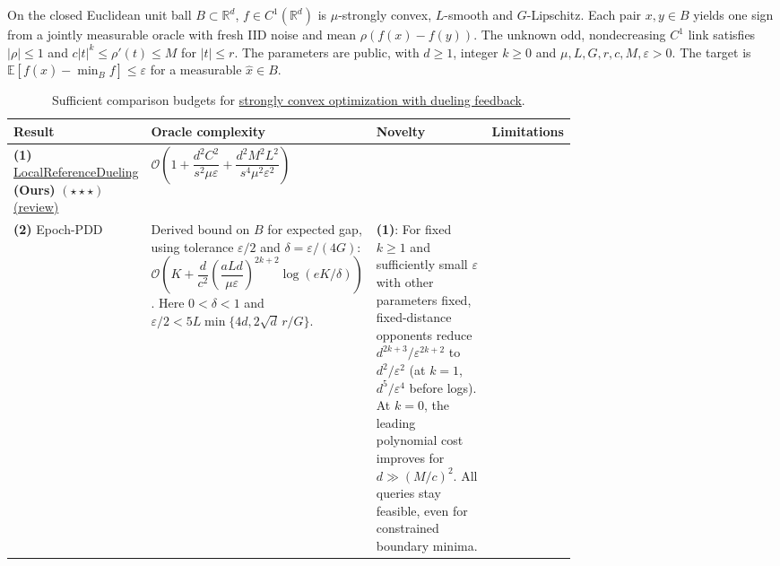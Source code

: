 \begin{table}[tp]
\centering
\caption{Sufficient comparison budgets for \href{https://github.com/k3nfalt/longtails/blob/main/LongTails/Setups/StronglyConvexDueling.lean}{strongly convex optimization with dueling feedback}.}\label{tab:StronglyConvexDueling}
\parbox{\linewidth}{\footnotesize On the closed Euclidean unit ball $B\subset\mathbb R^d$, $f\in C^1(\mathbb R^d)$ is $\mu$-strongly convex, $L$-smooth and $G$-Lipschitz. Each pair $x,y\in B$ yields one sign from a jointly measurable oracle with fresh IID noise and mean $\rho(f(x)-f(y))$. The unknown odd, nondecreasing $C^1$ link satisfies $|\rho|\le1$ and $c|t|^k\le\rho'(t)\le M$ for $|t|\le r$. The parameters are public, with $d\ge1$, integer $k\ge0$ and $\mu,L,G,r,c,M,\varepsilon>0$. The target is $\mathbb E[f(\hat x)-\min_B f]\le\varepsilon$ for a measurable $\hat x\in B$.}\par\smallskip
\begin{threeparttable}
\footnotesize
\setlength{\tabcolsep}{4pt}\renewcommand{\arraystretch}{1.25}
\begin{tabularx}{\linewidth}{@{}>{\raggedright\arraybackslash}p{0.17\linewidth}>{\raggedright\arraybackslash}p{0.29\linewidth}>{\raggedright\arraybackslash}p{0.27\linewidth}>{\raggedright\arraybackslash}X@{}}
\toprule
\textbf{Result} & \textbf{Oracle complexity} & \textbf{Novelty} & \textbf{Limitations} \\
\midrule
\textbf{(1)} \href{https://github.com/k3nfalt/longtails/blob/main/LongTails/Theorems/LocalReferenceDueling.lean}{Local\allowbreak Reference\allowbreak Dueling} \textbf{(Ours)} $(\star\star\star)$ \href{https://github.com/k3nfalt/longtails/blob/main/scripts/reviews/LocalReferenceDueling.md}{(review)}
& $\mathcal{O}\!\left(1+\dfrac{d^2 C^2}{s^2\mu\varepsilon}+\dfrac{d^2 M^2 L^2}{s^4\mu^2\varepsilon^2}\right)$ & & \\
\midrule[1.2pt]
\textbf{(2)} Epoch-PDD \citep[Thm.~4]{pmlr-v267-saha25a}
& Derived bound on $B$ for expected gap, using tolerance $\varepsilon/2$ and $\delta=\varepsilon/(4G)$:
$\mathcal{O}\!\left(K+\dfrac{d}{c^2}\left(\dfrac{aLd}{\mu\varepsilon}\right)^{2k+2}\log(eK/\delta)\right)$.
Here $0<\delta<1$ and $\varepsilon/2<5L\min\{4d,2\sqrt d\,r/G\}$.
& \textbf{(1)}: For fixed $k\ge1$ and sufficiently small $\varepsilon$ with other parameters fixed, fixed-distance opponents reduce $d^{2k+3}/\varepsilon^{2k+2}$ to $d^2/\varepsilon^2$ (at $k=1$, $d^5/\varepsilon^4$ before logs). At $k=0$, the leading polynomial cost improves for $d\gg(M/c)^2$. All queries stay feasible, even for constrained boundary minima.

\end{tabularx}
\end{threeparttable}
\end{table}
